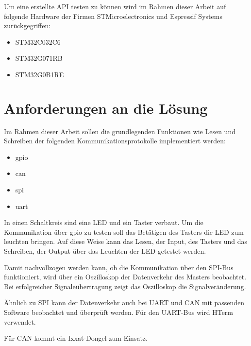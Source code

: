 Um eine erstellte API testen zu können wird im Rahmen dieser Arbeit auf folgende Hardware der Firmen STMicroelectronics und Espressif Systems zurückgegriffen:
\begin{itemize}
	\item STM32C032C6
	\item STM32G071RB
	\item STM32G0B1RE
\end{itemize}


\section{Anforderungen an die Lösung}
Im Rahmen dieser Arbeit sollen die grundlegenden Funktionen wie Lesen und Schreiben der folgenden Kommunikationsprotokolle implementiert werden:
\begin{itemize}
	\item \gls{gpio}
	\item \gls{can}
	\item \gls{spi}
	\item \gls{uart}
\end{itemize}

In einen Schaltkreis sind eine LED und ein Taster verbaut. 
Um die Kommunikation über \gls{gpio} zu testen soll das Betätigen des Tasters die LED zum leuchten bringen.
Auf diese Weise kann das Lesen, der Input, des Tasters und das Schreiben, der Output über das Leuchten der LED getestet werden.

Damit nachvollzogen werden kann, ob die Kommunikation über den SPI-Bus funktioniert, 
wird über ein Oszilloskop der Datenverkehr des Masters beobachtet. 
Bei erfolgreicher Signaleübertragung zeigt das Oszilloskop die Signalveränderung.

Ähnlich zu SPI kann der Datenverkehr auch bei UART und CAN mit passenden Software beobachtet und überprüft werden.
Für den UART-Bus wird HTerm verwendet. %

Für CAN kommt ein Ixxat-Dongel zum Einsatz. %




























